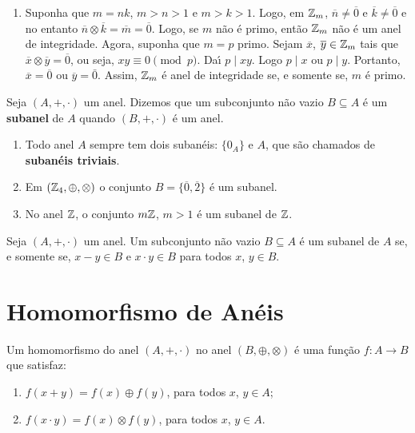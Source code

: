 \begin{exemplos}
\begin{enumerate}[label={\arabic*})]
		\item Suponha que $m = nk$, $m > n > 1$ e $m > k > 1$. Logo, em $\mathbb{Z}_m$, $\overline{n} \neq \overline{0}$ e $\overline{k} \neq \overline{0}$ e no entanto $\overline{n} \otimes \overline{k} = \overline{m} = \overline{0}$. Logo, se $m$ n{\~a}o {\'e} primo, ent{\~a}o $\mathbb{Z}_m$ n{\~a}o {\'e} um anel de integridade. Agora, suponha que $m = p$ primo. Sejam $\overline{x}$, $\overline{y} \in \mathbb{Z}_m$ tais que $\overline{x}\otimes \overline{y} = \overline{0}$, ou seja, $xy \equiv 0 \pmod p$. Da{\'\i} $p\mid xy$. Logo $p\mid x$ ou $p\mid y$. Portanto, $\overline{x} = \overline{0}$ ou $\overline{y} = \bar{0}$. Assim, $\mathbb{Z}_m$ {\'e} anel de integridade se, e somente se, $m$ {\'e} primo.
	\end{enumerate}
\end{exemplos}



\begin{definicao}
	Seja $(A, +, \cdot)$ um anel. Dizemos que um subconjunto n{\~a}o vazio $B\subseteq A$ {\'e} um \textbf{subanel} de $A$ quando $(B, +, \cdot)$ \'e um anel.
\end{definicao}

\begin{exemplos}
	\begin{enumerate}[label={\arabic*})]
		\item Todo anel $A$ sempre tem dois suban{\'e}is: $\{0_{A}\}$ e $A$, que s{\~a}o chamados de \textbf{suban{\'e}is triviais}.
		\item Em $(\mathbb{Z}_4,\oplus,\otimes)$ o conjunto $B = \{\overline{0}, \overline{2}\}$ \'e um subanel.
		\item No anel $\mathbb{Z}$, o conjunto $m\mathbb{Z}$, $m > 1$ {\'e} um subanel de $\mathbb{Z}$.
	\end{enumerate}	
\end{exemplos}

\begin{proposicao}
	Seja $(A, +,\cdot)$ um anel. Um subconjunto n{\~a}o vazio $B\subseteq A$ {\'e} um subanel de $A$ se, e somente se, $x - y \in B$ e $x\cdot y \in B$ para todos $x$, $y \in B$.
\end{proposicao}

\section{Homomorfismo de An\'eis} %
\label{sec:homomorfismo_de_aneis}

\begin{definicao}
	Um homomorfismo do anel $(A, +, \cdot)$ no anel $(B, \oplus, \otimes)$ {\'e} uma fun{\c c}{\~a}o $f : A \to B$ que satisfaz:
	\begin{enumerate}[label={\roman*})]
		\item $f(x + y) = f(x) \oplus f(y)$, para todos $x$, $y \in A$;
		\item $f(x \cdot y) = f(x)\otimes f(y)$, para todos $x$, $y \in A$.
	\end{enumerate}
\end{definicao}

